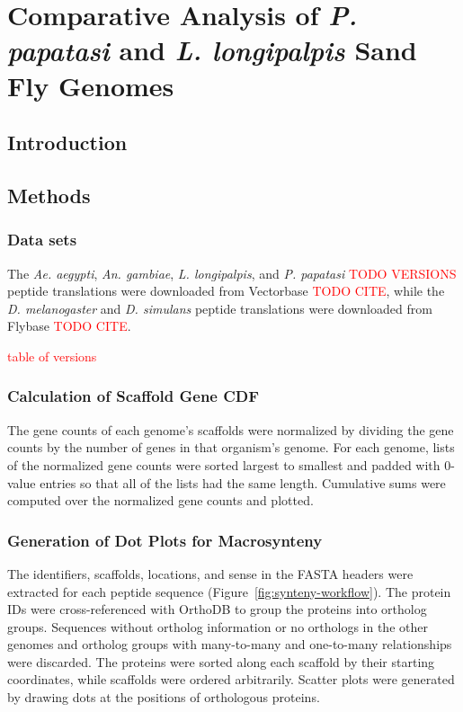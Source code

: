 \chapter{Comparative Analysis of \emph{P. papatasi} and \emph{L. longipalpis} Sand Fly Genomes}

\section{Introduction}

\section{Methods}

\subsection{Data sets}


The \emph{Ae. aegypti}, \emph{An. gambiae}, \emph{L. longipalpis}, and \emph{P. papatasi} \textcolor{red}{TODO VERSIONS} peptide translations were downloaded from Vectorbase \textcolor{red}{TODO CITE}, while the \emph{D. melanogaster} and \emph{D. simulans} peptide translations were downloaded from Flybase \textcolor{red}{TODO CITE}.

\textcolor{red}{table of versions}


\subsection{Calculation of Scaffold Gene CDF}
The gene counts of each genome's scaffolds were normalized by dividing the gene counts by the number of genes in that organism's genome. For each genome, lists of the normalized gene counts were sorted largest to smallest and padded with 0-value entries so that all of the lists had the same length.  Cumulative sums were computed over the normalized gene counts and plotted.


\subsection{Generation of Dot Plots for Macrosynteny} \label{sec:synteny-methods-dotplots}
The identifiers, scaffolds, locations, and sense in the FASTA headers were extracted for each peptide sequence (Figure~\ref{fig:synteny-workflow}).  The protein IDs were cross-referenced with OrthoDB to group the proteins into ortholog groups.  Sequences without ortholog information or no orthologs in the other genomes and ortholog groups with many-to-many and one-to-many relationships were discarded.  The proteins were sorted along each scaffold by their starting coordinates, while scaffolds were ordered arbitrarily.  Scatter plots were generated by drawing dots at the positions of orthologous proteins.

